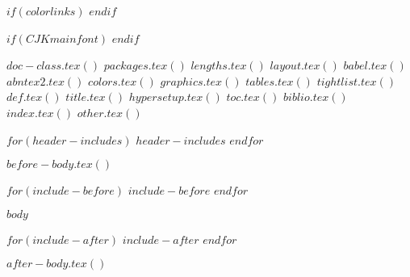 %

%

%




$if(colorlinks)$
$endif$

$if(CJKmainfont)$
$endif$

$doc-class.tex()$
$packages.tex()$
$lengths.tex()$
$layout.tex()$
$babel.tex()$
$abntex2.tex()$
$colors.tex()$
$graphics.tex()$
$tables.tex()$
$tightlist.tex()$
$def.tex()$
$title.tex()$
$hypersetup.tex()$
$toc.tex()$
$biblio.tex()$
$index.tex()$
$other.tex()$

$for(header-includes)$
$header-includes$
$endfor$





\pretextual

$before-body.tex()$

$for(include-before)$
$include-before$
$endfor$


\textual
$body$

$for(include-after)$
$include-after$
$endfor$

$after-body.tex()$

